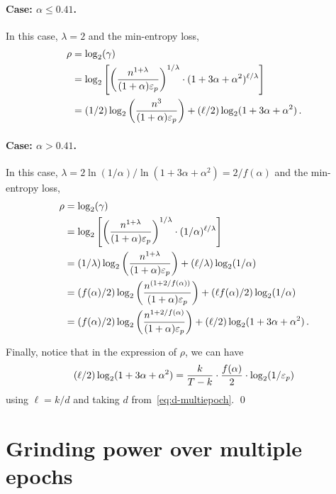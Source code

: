   \paragraph{Case: $\alpha \leq 0.41$.}
  In this case, $\lambda = 2$ and 
  the min-entropy loss, 
  \begin{align*}
    \rho &= \log_2(\gamma) \\
        &= \log_2 \left[  \left(\frac{n^{1 + \lambda} }{ (1+\alpha) \mathsf{\varepsilon}_p} \right)^{1/\lambda}
          \cdot (1 + 3 \alpha + \alpha^2)^{\ell/\lambda}
        \right] \\
        &= (1/2)\log_2 \left(\frac{n^3}{ (1+\alpha) \mathsf{\varepsilon}_p} \right) 
          + (\ell/2) \log_2(1 + 3 \alpha + \alpha^2)
        \,.
  \end{align*}
  
  \paragraph{Case: $\alpha > 0.41$.}
  In this case, $\lambda = 2 \ln(1/\alpha)/\ln(1+3\alpha+\alpha^2) = 2/f(\alpha)$ and 
  the min-entropy loss, 
  \begin{align*}
    \rho &= \log_2(\gamma) \\
        &= \log_2 \left[  \left(\frac{n^{1 + \lambda} }{ (1+\alpha) \mathsf{\varepsilon}_p} \right)^{1/\lambda}
          \cdot (1/\alpha)^{\ell/\lambda}
        \right] \\
        &= (1/\lambda) \log_2 \left(\frac{n^{1 + \lambda} }{ (1+\alpha) \mathsf{\varepsilon}_p} \right)
          + (\ell/\lambda) \log_2(1/\alpha)
        \\
        &= (f(\alpha)/2)\log_2 \left(\frac{n^{(1 + 2/f(\alpha))} }{ (1+\alpha) \mathsf{\varepsilon}_p} \right) 
          + (\ell f(\alpha)/2) \log_2(1/\alpha)
          \\
        &= (f(\alpha)/2)\log_2 \left(\frac{n^{1 + 2/f(\alpha)} }{ (1+\alpha) \mathsf{\varepsilon}_p} \right) 
          + (\ell/2) \log_2(1 + 3\alpha + \alpha^2)
        \,.
  \end{align*}

  Finally, notice that in the expression of $\rho$, we can have
  $$
  (\ell/2) \log_2(1+3\alpha + \alpha^2) = \frac{k}{T-k} \cdot \frac{f(\alpha)}{2}\cdot \log_2(1/\mathsf{\varepsilon}_p)
  $$
  using $\ell = k/d$ and taking $d$ from~\eqref{eq:d-multiepoch}.
\hfill\qed





\section{Grinding power over multiple epochs}

